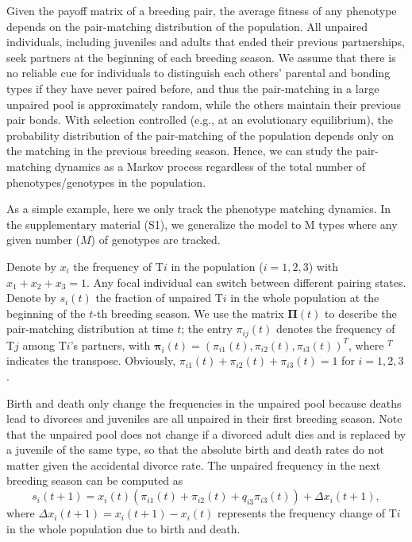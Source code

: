 \documentclass[12pt]{article}
\begin{document}
Given the payoff matrix of a breeding pair, the average fitness of any phenotype depends on the pair-matching distribution of the population. All unpaired individuals, including juveniles and adults that ended their previous partnerships, seek partners at the beginning of each breeding season. We assume that there is no reliable cue for individuals to distinguish each others' parental and bonding types if they have never paired before, and thus the pair-matching in a large unpaired pool is approximately random, while the others maintain their previous pair bonds. With selection controlled (e.g., at an evolutionary equilibrium), the probability distribution of the pair-matching of the population depends only on the matching in the previous breeding season. Hence, we can study the pair-matching dynamics as a Markov process regardless of the total number of phenotypes/genotypes in the population.

As a simple example, here we only track the phenotype matching dynamics. In the supplementary material (S1), we generalize the model to M types where any given number ($M$) of genotypes are tracked.

Denote by $x_i$ the frequency of T$i$ in the population ($i=1,2,3$) with $x_1 + x_2 + x_3=1$. Any focal individual can switch between different pairing states. Denote by $s_i(t)$ the fraction of unpaired T$i$ in the whole population at the beginning of the $t$-th breeding season. We use the matrix $\mathbf{\Pi} (t)$ to describe the pair-matching distribution at time $t$; the entry $\pi_{ij}(t)$ denotes the frequency of T$j$ among T$i$'s partners, with $\mathbf{\pi}_i(t) = \left( \pi_{i1}(t), \pi_{i2}(t), \pi_{i 3}(t)\right)^T$, where $^T$ indicates the transpose. Obviously, $\pi_{i1}(t)+ \pi_{i2}(t)+ \pi_{i 3}(t)=1$ for $i=1, 2, 3$. 

Birth and death only change the frequencies in the unpaired pool because deaths lead to divorces and juveniles are all unpaired in their first breeding season. Note that the unpaired pool does not change if a divorced adult dies and is replaced by a juvenile of the same type, so that the absolute birth and death rates do not matter given the accidental divorce rate. The unpaired frequency in the next breeding season can be computed as
\begin{equation}
s_i(t+1) = x_i(t)({\pi_{i1}(t) + \pi_{i2}(t) + q_{i3} \pi_{i3}(t)})+\Delta x_i(t+1),
\label{eqn:si}
\end{equation}
where $\Delta x_i (t+1) = x_i(t+1)-x_i(t)$ represents the frequency change of T$i$ in the whole population due to birth and death. 
\end{document}
